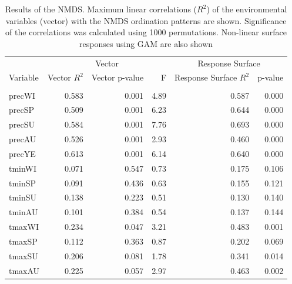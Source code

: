 \begin{table}
\caption{Results of the NMDS. Maximum linear correlations ($R^2$) of the environmental variables (vector) with the NMDS ordination patterns are shown. Significance of the correlations was calculated using 1000 permutations. Non-linear surface responses using GAM are also shown}\label{tab:multivar:nmds}
\centering\begingroup\fontsize{8}{10}\selectfont
\begin{tabular}{lrrrrr}
\toprule
\multicolumn{1}{c}{ } & \multicolumn{3}{c}{Vector} & \multicolumn{2}{c}{Response Surface} \\
\cmidrule(l{3pt}r{3pt}){2-4} \cmidrule(l{3pt}r{3pt}){5-6}
Variable & Vector $R^2$ & Vector p-value & F & Response Surface $R^2$ & p-value\\
\midrule
\addlinespace[0.3em]
\multicolumn{6}{l}{\textbf{Climate}}\\
\hspace{1em}precWI & 0.583 & 0.001 & 4.89 & 0.587 & 0.000\\
\hspace{1em}precSP & 0.509 & 0.001 & 6.23 & 0.644 & 0.000\\
\hspace{1em}precSU & 0.584 & 0.001 & 7.76 & 0.693 & 0.000\\
\hspace{1em}precAU & 0.526 & 0.001 & 2.93 & 0.460 & 0.000\\
\hspace{1em}precYE & 0.613 & 0.001 & 6.14 & 0.640 & 0.000\\
\hspace{1em}tminWI & 0.071 & 0.547 & 0.73 & 0.175 & 0.106\\
\hspace{1em}tminSP & 0.091 & 0.436 & 0.63 & 0.155 & 0.121\\
\hspace{1em}tminSU & 0.138 & 0.223 & 0.51 & 0.130 & 0.140\\
\hspace{1em}tminAU & 0.101 & 0.384 & 0.54 & 0.137 & 0.144\\
\hspace{1em}tmaxWI & 0.234 & 0.047 & 3.21 & 0.483 & 0.001\\
\hspace{1em}tmaxSP & 0.112 & 0.363 & 0.87 & 0.202 & 0.069\\
\hspace{1em}tmaxSU & 0.206 & 0.081 & 1.78 & 0.341 & 0.014\\
\hspace{1em}tmaxAU & 0.225 & 0.057 & 2.97 & 0.463 & 0.002\\

\end{tabular}
\end{table}
